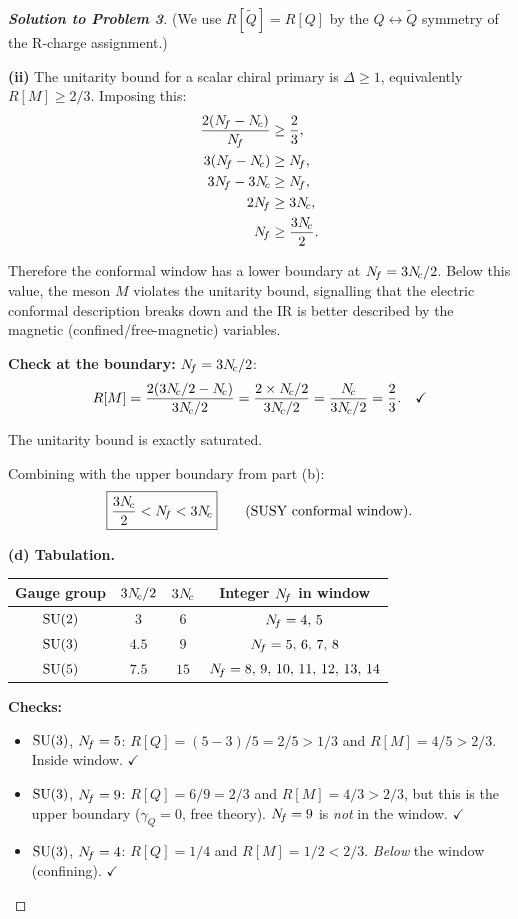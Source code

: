 \documentclass[11pt,a4paper]{article}
\begin{document}
\begin{proof}[\textbf{Solution to Problem 3}]
(We use $R[\widetilde{Q}] = R[Q]$ by the $Q \leftrightarrow \widetilde{Q}$
symmetry of the R-charge assignment.)

\textbf{(ii)} The unitarity bound for a scalar chiral primary is
$\Delta \geq 1$, equivalently $R[M] \geq 2/3$.  Imposing this:
\begin{align}
  \frac{2(\Nf - \Nc)}{\Nf} &\geq \frac{2}{3}, \\
  3(\Nf - \Nc) &\geq \Nf, \\
  3\Nf - 3\Nc &\geq \Nf, \\
  2\Nf &\geq 3\Nc, \\
  \Nf &\geq \frac{3\Nc}{2}.
\end{align}

Therefore the conformal window has a lower boundary at $N_{\!f} = 3N_{\!c}/2$.
Below this value, the meson $M$ violates the unitarity bound, signalling
that the electric conformal description breaks down and the IR is better described by the magnetic (confined/free-magnetic) variables.

\textbf{Check at the boundary:} $N_{\!f} = 3N_{\!c}/2$:
\begin{equation}
  R[M] = \frac{2(3N_{\!c}/2 - N_{\!c})}{3N_{\!c}/2}
  = \frac{2 \times N_{\!c}/2}{3N_{\!c}/2}
  = \frac{N_{\!c}}{3N_{\!c}/2}
  = \frac{2}{3}. \quad\checkmark
\end{equation}

The unitarity bound is exactly saturated.

Combining with the upper boundary from part (b):
\begin{equation}
  \boxed{%
  \frac{3\Nc}{2} < \Nf < 3\Nc
  }
  \qquad\text{(SUSY conformal window).}
\end{equation}

\textbf{(d) Tabulation.}

\begin{center}
\renewcommand{\arraystretch}{1.3}
\begin{tabular}{@{}c c c c@{}}
\toprule
Gauge group & $3N_{\!c}/2$ & $3N_{\!c}$ & Integer $N_{\!f}$ in window \\
\midrule
$\mathrm{SU}(2)$ & $3$ & $6$ & $N_{\!f} = 4,\, 5$ \\
$\mathrm{SU}(3)$ & $4.5$ & $9$ & $N_{\!f} = 5,\, 6,\, 7,\, 8$ \\
$\mathrm{SU}(5)$ & $7.5$ & $15$ & $N_{\!f} = 8,\, 9,\, 10,\, 11,\, 12,\, 13,\, 14$ \\
\bottomrule
\end{tabular}
\end{center}

\textbf{Checks:}
\begin{itemize}
  \item $\mathrm{SU}(3)$, $N_{\!f} = 5$: $R[Q] = (5-3)/5 = 2/5 > 1/3$ and
    $R[M] = 4/5 > 2/3$. Inside window. $\checkmark$
  \item $\mathrm{SU}(3)$, $N_{\!f} = 9$: $R[Q] = 6/9 = 2/3$ and $R[M] = 4/3 > 2/3$,
    but this is the upper boundary ($\gamma_Q = 0$, free theory).
    $N_{\!f} = 9$ is \emph{not} in the window.  $\checkmark$
  \item $\mathrm{SU}(3)$, $N_{\!f} = 4$: $R[Q] = 1/4$ and $R[M] = 1/2 < 2/3$.
    \emph{Below} the window (confining). $\checkmark$
\end{itemize}


\end{proof}
\end{document}
